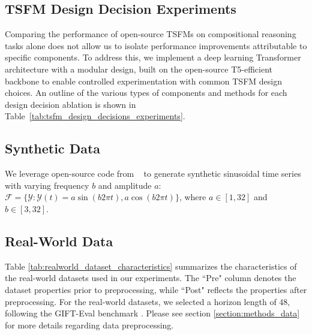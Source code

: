 \subsection{TSFM Design Decision Experiments}\label{apd:experiment_table}
Comparing the performance of open-source TSFMs on compositional reasoning tasks alone does not allow us to isolate performance improvements attributable to specific components. To address this, we implement a deep learning Transformer architecture with a modular design, built on the open-source T5-efficient backbone \citep{wolf_2020_hgtransformers} to enable controlled experimentation with common TSFM design choices. An outline of the various types of components and methods for each design decision ablation is shown in Table~\ref{tab:tsfm_design_decisions_experiments}.


\subsection{Synthetic Data}\label{apd:synthetic_data_parameters}
We leverage open-source code from \MOMENT ~\citep{goswami2024moment} to generate synthetic sinusoidal time series with varying frequency $b$ and amplitude $a$: $\mathcal{F} = \{\mathcal{Y} : \mathcal{Y}(t) = a\sin(b 2\pi t), a\cos(b 2\pi t)\}$, where $a \in [1, 32]$ and $b \in [3, 32]$.

\subsection{Real-World Data}\label{apd:realworld_data_parameters}
Table \ref{tab:realworld_dataset_characteristics} summarizes the characteristics of the real-world datasets used in our experiments. The ``Pre" column denotes the dataset properties prior to preprocessing, while ``Post" reflects the properties after preprocessing. For the real-world datasets, we selected a horizon length of 48, following the GIFT-Eval benchmark \citep{aksu2024giftevalbenchmark}. Please see section \ref{section:methods_data} for more details regarding data preprocessing.


